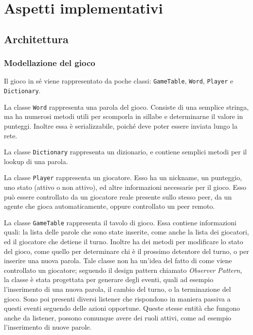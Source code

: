 \documentclass[10.5pt]{article}
\begin{document}
\section{Aspetti implementativi}

\subsection{Architettura}

\subsubsection{Modellazione del gioco}

Il gioco in sé viene rappresentato da poche classi: \texttt{GameTable}, \texttt{Word}, \texttt{Player} e \texttt{Dictionary}.

La classe \texttt{Word} rappresenta una parola del gioco. Consiste di una semplice stringa, ma ha numerosi metodi utili per scomporla in sillabe e determinarne il valore in punteggi. Inoltre essa è serializzabile, poiché deve poter essere inviata lungo la rete.  

La classe \texttt{Dictionary} rappresenta un dizionario, e contiene semplici metodi per il lookup di una parola.

La classe \texttt{Player} rappresenta un giocatore. Esso ha un nickname, un punteggio, uno stato (attivo o non attivo), ed altre informazioni necessarie per il gioco. Esso può essere controllato da un giocatore reale presente sullo stesso peer, da un agente che gioca automaticamente, oppure controllato un peer remoto.

La classe \texttt{GameTable} rappresenta il tavolo di gioco. Essa contiene informazioni quali: la lista delle parole che sono state inserite, come anche la lista dei giocatori, ed il giocatore che detiene il turno. Inoltre ha dei metodi per modificare lo stato del gioco, come quello per determinare chi è il prossimo detentore del turno, o per inserire una nuova parola. Tale classe non ha un'idea del fatto di come viene controllato un giocatore; seguendo il design pattern chiamato \textit{Observer Pattern}, la classe è stata progettata per generare degli eventi, quali ad esempio l'inserimento di una nuova parola, il cambio del turno, o la terminazione del gioco. Sono poi presenti diversi listener che rispondono in maniera passiva a questi eventi seguendo delle azioni opportune. Queste stesse entità che fungono anche da listener, possono comunque avere dei ruoli attivi, come ad esempio l'inserimento di nuove parole. 
\end{document}
